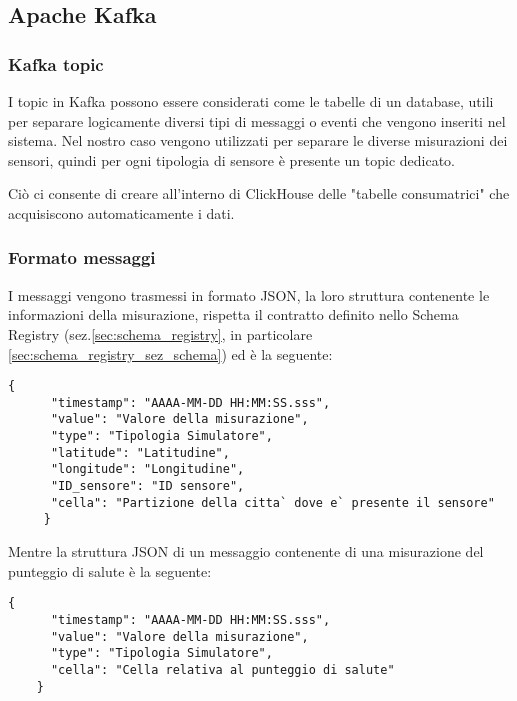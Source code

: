 \subsection{Apache Kafka}
\subsubsection{Kafka topic}
I topic in Kafka possono essere considerati come le tabelle di un database, utili per separare logicamente diversi tipi di messaggi o eventi che vengono inseriti nel sistema. Nel nostro caso vengono utilizzati per separare le diverse misurazioni dei sensori, quindi per ogni tipologia di sensore è presente un topic dedicato.

Ciò ci consente di creare all'interno di ClickHouse delle "tabelle consumatrici" che acquisiscono automaticamente i dati.

\subsubsection{Formato messaggi} \label{sec:formatoMessaggi}
I messaggi vengono trasmessi in formato JSON, la loro struttura contenente le informazioni della misurazione, rispetta il contratto definito nello Schema Registry (sez.\ref{sec:schema_registry}, in particolare \ref{sec:schema_registry_sez_schema}) ed è la seguente:
\begin{lstlisting}[style=code]
    {
      "timestamp": "AAAA-MM-DD HH:MM:SS.sss", 
      "value": "Valore della misurazione",  
      "type": "Tipologia Simulatore",
      "latitude": "Latitudine",
      "longitude": "Longitudine",
      "ID_sensore": "ID sensore",
      "cella": "Partizione della citta` dove e` presente il sensore" 
     }
\end{lstlisting}

Mentre la struttura JSON di un messaggio contenente di una misurazione del punteggio di salute è la seguente:
\begin{lstlisting}[style=code]
    {
      "timestamp": "AAAA-MM-DD HH:MM:SS.sss", 
      "value": "Valore della misurazione",  
      "type": "Tipologia Simulatore",
      "cella": "Cella relativa al punteggio di salute"
    }
\end{lstlisting}


